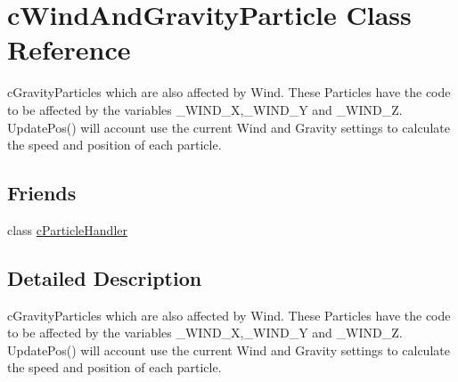 \hypertarget{classc_wind_and_gravity_particle}{
\section{cWindAndGravityParticle Class Reference}
\label{classc_wind_and_gravity_particle}
}


cGravityParticles which are also affected by Wind. These Particles have the code to be affected by the variables \_\-WIND\_\-X,\_\-WIND\_\-Y and \_\-WIND\_\-Z. UpdatePos() will account use the current Wind and Gravity settings to calculate the speed and position of each particle.  


\subsection*{Friends}
\begin{DoxyCompactItemize}
\item 
\hypertarget{classc_wind_and_gravity_particle_ad810bc5f0330a0154ffaabe8d256379c}{
class \hyperlink{classc_wind_and_gravity_particle_ad810bc5f0330a0154ffaabe8d256379c}{cParticleHandler}}
\label{classc_wind_and_gravity_particle_ad810bc5f0330a0154ffaabe8d256379c}

\end{DoxyCompactItemize}


\subsection{Detailed Description}
cGravityParticles which are also affected by Wind. These Particles have the code to be affected by the variables \_\-WIND\_\-X,\_\-WIND\_\-Y and \_\-WIND\_\-Z. UpdatePos() will account use the current Wind and Gravity settings to calculate the speed and position of each particle. 